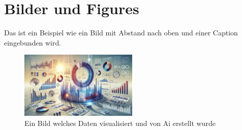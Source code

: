 \section{Bilder und Figures}
Das ist ein Beispiel wie ein Bild mit Abstand nach oben und einer Caption eingebunden wird.

\vspace{1cm}
\begin{figure}[h]
  \centering
  \includegraphics[width=0.5\textwidth]{bild.jpg}
  \caption{Ein Bild welches Daten visualisiert und von Ai erstellt wurde}
\end{figure}
